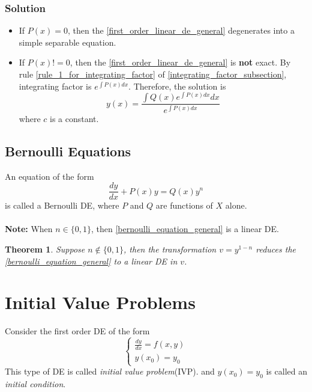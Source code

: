 \documentclass[oneside]{book}
\newtheorem{theorem}{Theorem}[chapter]
\begin{document}
\subsubsection{Solution}
\begin{itemize}
	\item If $P(x) = 0$, then the \cref{first_order_linear_de_general} degenerates into a simple separable equation.
	\item If $P(x) != 0$, then the \cref{first_order_linear_de_general} is \textbf{not} exact. By rule \ref{rule_1_for_integrating_factor} of \cref{integrating_factor_subsection}, integrating factor is \(\displaystyle e^{\int P(x)dx}\). Therefore, the solution is
	      \[
		      y(x) = \frac{\int Q(x)e^{\int P(x)dx}dx}{e^{\int P(x)dx}}
	      \]
	      where $c$ is a constant.
\end{itemize}

\subsection{Bernoulli Equations}
An equation of the form
\begin{equation}
	\frac{dy}{dx} + P(x) y  = Q(x) y^n
	\label{bernoulli_equation_general}
\end{equation}
is called a Bernoulli DE, where $P$ and $Q$ are functions of $X$ alone.
\\\\
\noindent\textbf{Note:} When $n\in\{0, 1\}$, then \cref{bernoulli_equation_general} is a linear DE.

\begin{theorem}
	Suppose \(n\notin\{0, 1\}\), then the transformation \(v = y^{1-n}\) reduces the \cref{bernoulli_equation_general} to a linear DE in \(v\).
\end{theorem}

\section{Initial Value Problems}
Consider the first order DE of the form
\[
	\begin{cases}
		\frac{dy}{dx} = f(x, y) \\
		y(x_0) = y_0
	\end{cases}
\]
This type of DE is called \textit{initial value problem}(IVP). and \(y(x_0) = y_0\) is called an \textit{initial condition}.



\end{document}
